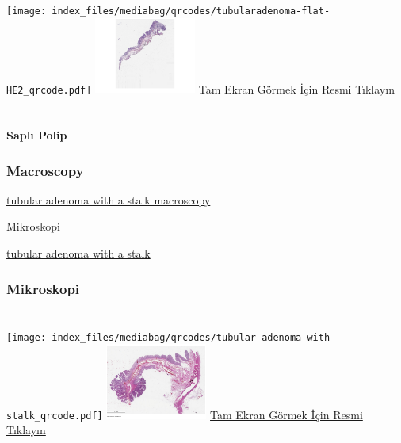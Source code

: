 \documentclass[
  letterpaper,
  DIV=11,
  numbers=noendperiod]{scrreprt}
\begin{document}
\texttt{[image: index\_files/mediabag/qrcodes/tubularadenoma-flat-HE2\_qrcode.pdf]}
\href{https://images.patolojiatlasi.com/tubularadenoma-flat/HE2.html}{\includegraphics[width=0.25\textwidth,height=\textheight]{./screenshots/thumbnail_tubularadenoma-flat2.png}}
\href{https://images.patolojiatlasi.com/tubularadenoma-flat/HE2.html}{Tam
Ekran Görmek İçin Resmi Tıklayın}

\hypertarget{section-9}{%
\chapter{}\label{section-9}}

\hypertarget{sec-sapli-polip}{%
\subsubsection{Saplı Polip}\label{sec-sapli-polip}}

\hypertarget{macroscopy}{%
\subsection{Macroscopy}\label{macroscopy}}

\href{https://images.patolojiatlasi.com/tubularadenoma/tubular-adenoma-with-stalk-macroscopy.png}{tubular
adenoma with a stalk macroscopy}

Mikroskopi

\href{https://images.patolojiatlasi.com/tubularadenoma/tubular-adenoma-with-stalk.png}{tubular
adenoma with a stalk}

\hypertarget{mikroskopi}{%
\subsection{Mikroskopi}\label{mikroskopi}}

\hypertarget{section-10}{%
\chapter{}\label{section-10}}

\texttt{[image: index\_files/mediabag/qrcodes/tubular-adenoma-with-stalk\_qrcode.pdf]}
\href{https://images.patolojiatlasi.com/tubularadenoma/tubular-adenoma-with-stalk/viewer_z0.html}{\includegraphics[width=0.25\textwidth,height=\textheight]{./screenshots/thumbnail_tubular-adenoma-with-stalk.png}}
\href{https://images.patolojiatlasi.com/tubularadenoma/tubular-adenoma-with-stalk/viewer_z0.html}{Tam
Ekran Görmek İçin Resmi Tıklayın}
\end{document}
